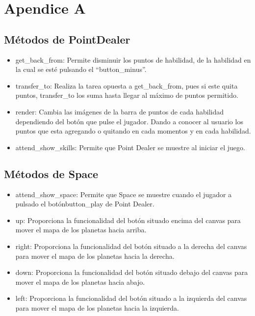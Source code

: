 \documentclass[a4paper,10pt]{article}
\begin{document}
\cleardoublepage



\appendix
\section{Apendice A}
\subsection{Métodos de PointDealer}
\begin{itemize}
 \item get\_back\_from: Permite disminuir los puntos de habilidad, 
 de la habilidad en la cual se esté pulsando el “button\_minus”.
 \item transfer\_to: Realiza la tarea opuesta a get\_back\_from, pues si este quita puntos, transfer\_to los suma hasta llegar al máximo de puntos permitido.
 \item render: Cambia las imágenes de la barra de puntos de cada habilidad dependiendo del botón que pulse el jugador. Dando a conocer al usuario los puntos que esta agregando o quitando en cada momentos y en cada habilidad.
 \item attend\_show\_skills: Permite que Point Dealer se muestre al iniciar el juego.
\end{itemize}


\subsection{Métodos de Space}
\begin{itemize}
 \item attend\_show\_space: Permite que Space se muestre cuando el jugador a pulsado el botónbutton\_play  de Point Dealer.
 \item up: Proporciona la funcionalidad del botón situado encima del canvas para mover el mapa de los planetas hacia arriba.
 \item right: Proporciona la funcionalidad del botón situado a la derecha del canvas para mover el mapa de los planetas hacia la derecha.
 \item down: Proporciona la funcionalidad del botón situado debajo del canvas para mover el mapa de los planetas hacia abajo.
 \item left: Proporciona la funcionalidad del botón situado a la izquierda del canvas para mover el mapa de los planetas hacia la izquierda.
\end{itemize}
\end{document}
